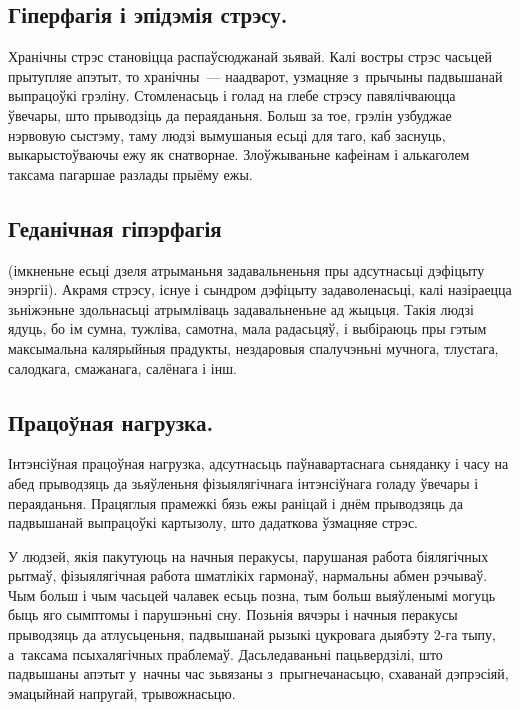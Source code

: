 \subsection{Гіперфагія і эпідэмія стрэсу.}
Хранічны стрэс становіцца распаўсюджанай зьявай. Калі востры стрэс часьцей прытупляе апэтыт, то хранічны~--- наадварот, узмацняе з~прычыны падвышанай выпрацоўкі грэліну. Стомленасьць і голад на глебе стрэсу павялічваюцца ўвечары, што прыводзіць да пераяданьня. Больш за тое, грэлін узбуджае нэрвовую сыстэму, таму людзі вымушаныя есьці для таго, каб заснуць, выкарыстоўваючы ежу як снатворнае. Злоўжываньне кафеінам і алькаголем таксама пагаршае разлады прыёму ежы.

\subsection{Геданічная гіпэрфагія} (імкненьне есьці дзеля атрыманьня задавальненьня пры адсутнасьці дэфіцыту энэргіі).
Акрамя стрэсу, існуе і сындром дэфіцыту задаволенасьці, калі назіраецца зьніжэньне здольнасьці атрымліваць задавальненьне ад жыцьця. Такія людзі ядуць, бо ім сумна, тужліва, самотна, мала радасьцяў, і выбіраюць пры гэтым максымальна калярыйныя прадукты, нездаровыя спалучэньні мучнога, тлустага, салодкага, смажанага, салёнага і інш.


\subsection{Працоўная нагрузка.}
Інтэнсіўная працоўная нагрузка, адсутнасьць паўнавартаснага сьняданку і часу на абед прыводзяць да зьяўленьня фізыялягічнага інтэнсіўнага голаду ўвечары і пераяданьня. Працяглыя прамежкі бязь ежы раніцай і днём прыводзяць да падвышанай выпрацоўкі картызолу, што дадаткова ўзмацняе стрэс.

У людзей, якія пакутуюць на начныя перакусы, парушаная работа біялягічных рытмаў, фізыялягічная работа шматлікіх гармонаў, нармальны абмен рэчываў. Чым больш і чым часьцей чалавек есьць позна, тым больш выяўленымі могуць быць яго сымптомы і парушэньні сну. Позьнія вячэры і начныя перакусы прыводзяць да атлусьценьня, падвышанай рызыкі цукровага дыябэту 2-га тыпу, а~таксама псыхалягічных праблемаў. Дасьледаваньні пацьвердзілі, што падвышаны апэтыт у~начны час зьвязаны з~прыгнечанасьцю, схаванай дэпрэсіяй, эмацыйнай напругай, трывожнасьцю.

